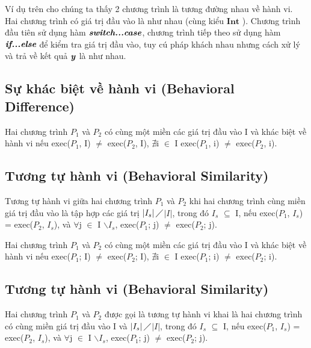 Ví dụ trên cho chúng ta thấy 2 chương trình là tương đường nhau về
hành vi. Hai chương trình có giá trị đầu vào là như nhau (cùng kiểu
$\textbf{Int}$ ). Chương trình đầu tiên sử dụng hàm
$\textit{\textbf{switch...case}}$, chương trình tiếp theo sử dụng hàm
$\textit{\textbf{if...else}}$ để kiểm tra giá trị đầu vào, tuy cú pháp
khách nhau nhưng cách xử lý và trả về kết quả $\textbf{\textit{y}}$ là
như nhau.
	
\subsection{Sự khác biệt về hành vi (Behavioral Difference)}

\begin{definition}
  Hai chương trình $P_{1}$ và $P_{2}$ có cùng một miền các giá trị đầu
  vào I và khác biệt về hành vi nếu exec($P_{1}$, I) $\neq$
  exec($P_{2}$, I), $\nexists$i $\in$ I exec($P_{1}$, i) $\neq$
  exec($P_{2}$, i).
\end{definition}

	
\subsection{Tương tự hành vi (Behavioral Similarity)}

\begin{definition}
  Tương tự hành vi giữa hai chương trình $P_{1}$ và $P_{2}$ khi hai
  chương trình cùng miền giá trị đầu vào là tập hợp các giá trị
  $\left|I_{s}\right|\diagup$$\left|I\right|$, trong đó
  $I_{s}$ $\subseteq $ I, nếu exec($P_{1}$, $I_{s}$) =
  exec($P_{2}$, $I_{s}$), và $\forall$j $\in$ I
  $\backslash$$I_{s}$, exec($P_{1}$; j) $\neq$ exec($P_{2}$; j).
\end{definition}



\begin{definition}
  Hai chương trình $P_{1}$ và $P_{2}$ có cùng một miền các giá trị đầu
  vào I và khác biệt về hành vi nếu exec($P_{1}$; I) $\neq$
  exec($P_{2}$; I), $\nexists$i $\in$ I exec($P_{1}$; i) $\neq$
  exec($P_{2}$; i).
\end{definition}

	
\subsection{Tương tự hành vi (Behavioral Similarity)}

\begin{definition}
  Hai chương trình $P_{1}$ và $P_{2}$ được gọi là tương tự hành vi
  khai là hai chương trình có cùng miền giá trị đầu vào I và
  $\left|I_{s}\right|\diagup$$\left|I\right|$, trong đó
  $I_{s}$ $\subseteq $ I, nếu exec($P_{1}$, $I_{s}$) =
  exec($P_{2}$, $I_{s}$), và $\forall$j $\in$ I
  $\backslash$$I_{s}$, exec($P_{1}$; j) $\neq$ exec($P_{2}$; j).
\end{definition}


